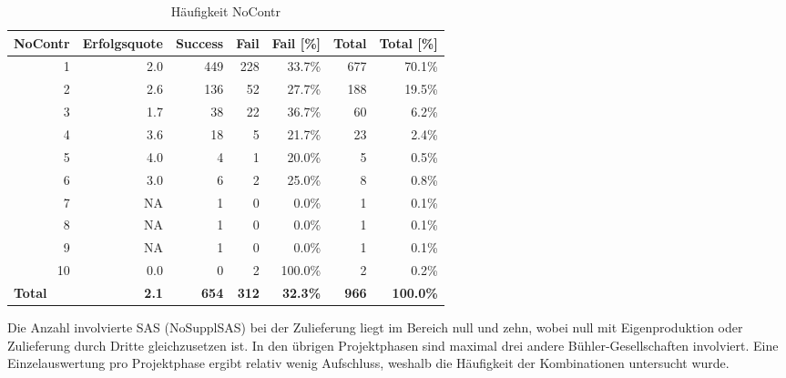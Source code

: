 \begin{table}[H]
	\centering
	\caption{Häufigkeit NoContr}
	\begin{tabular}{lrrrrrr}
		\textbf{NoContr} & \multicolumn{1}{l}{\textbf{Erfolgsquote}} & \multicolumn{1}{l}{\textbf{Success}} & \multicolumn{1}{l}{\textbf{Fail}} & \multicolumn{1}{l}{\textbf{Fail [\%]}} & \multicolumn{1}{l}{\textbf{Total}} & \multicolumn{1}{l}{\textbf{Total [\%]}} \\\hline
		\multicolumn{1}{r}{1} & 2.0   & 449   & 228   & 33.7\% & 677   & 70.1\% \\
		\multicolumn{1}{r}{2} & 2.6   & 136   & 52    & 27.7\% & 188   & 19.5\% \\
		\multicolumn{1}{r}{3} & 1.7   & 38    & 22    & 36.7\% & 60    & 6.2\% \\
		\multicolumn{1}{r}{4} & 3.6   & 18    & 5     & 21.7\% & 23    & 2.4\% \\
		\multicolumn{1}{r}{5} & 4.0   & 4     & 1     & 20.0\% & 5     & 0.5\% \\
		\multicolumn{1}{r}{6} & 3.0   & 6     & 2     & 25.0\% & 8     & 0.8\% \\
		\multicolumn{1}{r}{7} & NA    & 1     & 0     & 0.0\% & 1     & 0.1\% \\
		\multicolumn{1}{r}{8} & NA    & 1     & 0     & 0.0\% & 1     & 0.1\% \\
		\multicolumn{1}{r}{9} & NA    & 1     & 0     & 0.0\% & 1     & 0.1\% \\
		\multicolumn{1}{r}{10} & 0.0   & 0     & 2     & 100.0\% & 2     & 0.2\% \\\hline
		\textbf{Total} & \textbf{2.1} & \textbf{654} & \textbf{312} & \textbf{32.3\%} & \textbf{966} & \textbf{100.0\%} \\
	\end{tabular}%
	\label{fnocontr}%
\end{table}%
%
%
Die Anzahl involvierte SAS (NoSupplSAS) bei der Zulieferung liegt im Bereich null und zehn, wobei null mit Eigenproduktion oder Zulieferung durch Dritte gleichzusetzen ist. In den übrigen Projektphasen sind maximal drei andere Bühler-Gesellschaften involviert. Eine Einzelauswertung pro Projektphase ergibt relativ wenig Aufschluss, weshalb die Häufigkeit der Kombinationen untersucht wurde. 
